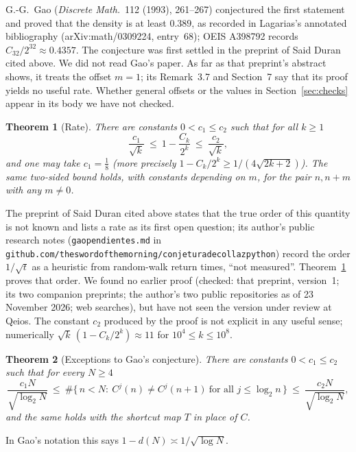\documentclass[11pt]{article}
\newtheorem{theorem}{Theorem}
\theoremstyle{remark}
\begin{document}
G.-G.~Gao (\emph{Discrete Math.}\ 112 (1993), 261--267) conjectured the first statement and proved
that the density is at least $0.389$, as recorded in Lagarias's annotated bibliography
(arXiv:math/0309224, entry~68); OEIS A398792 records $C_{32}/2^{32}\approx0.4357$. The conjecture
was first settled in the preprint of Said Duran cited above. We did not read Gao's paper. As far as
that preprint's abstract shows, it treats the offset $m=1$; its Remark~3.7 and Section~7 say that its proof
yields no useful rate. Whether general offsets or the values in Section~\ref{sec:checks} appear
in its body we have not checked.

\begin{theorem}[Rate]\label{rate}
There are constants $0<c_1\le c_2$ such that for all $k\ge1$
\[
\frac{c_1}{\sqrt k}\ \le\ 1-\frac{C_k}{2^k}\ \le\ \frac{c_2}{\sqrt k},
\]
and one may take $c_1=\tfrac18$ (more precisely $1-C_k/2^k\ge 1/(4\sqrt{2k+2})$). The same two-sided
bound holds, with constants depending on $m$, for the pair $n,n+m$ with any $m\ne0$.
\end{theorem}
The preprint of Said Duran cited above states that the true order of this quantity is not known
and lists a rate as its first open question; its author's public research notes
(\texttt{gaopendientes.md} in \texttt{github.com/theswordofthemorning/conjeturadecollazpython})
record the order $1/\sqrt t$ as a heuristic from random-walk return times, ``not measured''.
Theorem~\ref{rate} proves that order. We found no earlier proof (checked: that preprint, version~1;
its two companion preprints; the author's two public repositories as of 23 November 2026; web
searches), but have not seen the version under review at Qeios. The constant
$c_2$ produced by the proof is not explicit in any useful sense; numerically
$\sqrt k\,(1-C_k/2^k)\approx 11$ for $10^4\le k\le10^8$.

\begin{theorem}[Exceptions to Gao's conjecture]\label{exc}
There are constants $0<c_1\le c_2$ such that for every $N\ge4$
\[
\frac{c_1N}{\sqrt{\log_2N}}\ \le\ \#\{\,n<N:\ C^{j}(n)\ne C^{j}(n+1)\ \text{for all } j\le\log_2n\,\}\ \le\ \frac{c_2N}{\sqrt{\log_2N}} ,
\]
and the same holds with the shortcut map $T$ in place of $C$.
\end{theorem}
In Gao's notation this says $1-d(N)\asymp1/\sqrt{\log N}$.
\end{document}
